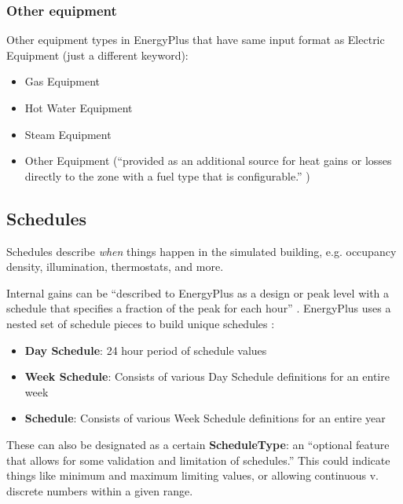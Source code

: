 \documentclass[10pt]{article}
\begin{document}
\subsubsection{Other equipment}

Other equipment types in EnergyPlus that have same input format as Electric Equipment (just a different keyword):

\begin{itemize}
    \setlength{\itemsep}{0pt}%
    \setlength{\parskip}{0pt}%
    \item Gas Equipment
    \item Hot Water Equipment
    \item Steam Equipment
    \item Other Equipment (``provided as an additional source for heat gains or losses directly to the zone
with a fuel type that is configurable.'' \cite{EPdocs9inputoutput})
\end{itemize}



\subsection{Schedules}

Schedules describe \textit{when} things happen in the simulated building, e.g. occupancy density, illumination, thermostats, and more.

Internal gains can be ``described to EnergyPlus as a design or peak level with a
schedule that specifies a fraction of the peak for each hour'' \cite{EPdocs9gettingstarted}. EnergyPlus uses a nested set of schedule pieces to build unique schedules \cite{EPcourseteaching}:

\vspace{-6pt}
\begin{itemize}
    \setlength{\itemsep}{0pt}%
    \setlength{\parskip}{0pt}%
    \item \textbf{Day Schedule}: 24 hour period of schedule values
    \item \textbf{Week Schedule}: Consists of various Day Schedule definitions for an entire week
    \item \textbf{Schedule}: Consists of various Week Schedule definitions for an entire year
\end{itemize}
\vspace{-6pt}

These can also be designated as a certain \textbf{ScheduleType}: an ``optional feature that allows for some validation and limitation of schedules.'' This could indicate things like minimum and maximum limiting values, or allowing continuous v. discrete numbers within a given range.  \cite{EPcourseteaching}
\end{document}
